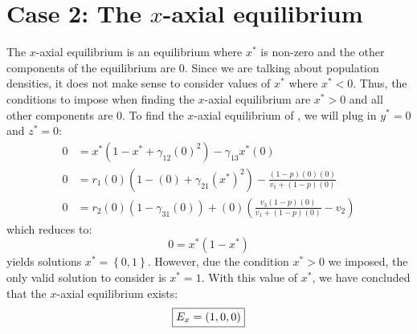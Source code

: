 \section{Case 2: The $x$-axial equilibrium}\label{sec:x_axial_equilibrium}
The $x$-axial equilibrium is an equilibrium where $x^*$ is non-zero and the other components of the equilibrium are 0. Since we are talking about population densities, it does not make sense to consider values of $x^*$ where $x^*<0$. Thus, the conditions to impose when finding the $x$-axial equilibrium are $x^*>0$ and all other components are 0. To find the $x$-axial equilibrium of , we will plug in $y^*=0$ and $z^*=0$:
\begin{align*}
    0 &= x^*\left(1-x^*+\gamma_{12}(0)^2\right)-\gamma_{13}x^*(0)\\
    0 &= r_1(0)\left(1-(0)+\gamma_{21}\left(x^*\right)^2\right)-\frac{\left(1-p\right)(0)(0)}{v_1+\left(1-p\right)(0)}\\
    0 &= r_2(0)\left(1-\gamma_{31}(0)\right)+(0)\left(\frac{v_3\left(1-p\right)(0)}{v_1+\left(1-p\right)(0)}-v_2\right)
\end{align*}
which reduces to:
\begin{equation}
    0 = x^*\left(1-x^*\right)
    \label{eq:4.2}
\end{equation}
 yields solutions $x^*=\left\{0, 1\right\}$. However, due the condition $x^*>0$ we imposed, the only valid solution to consider is $x^*=1$. With this value of $x^*$, we have concluded that the $x$-axial equilibrium exists:
\[
\fbox{$\displaystyle E_x=\left(
1,
0,
0
\right)$}
\]

